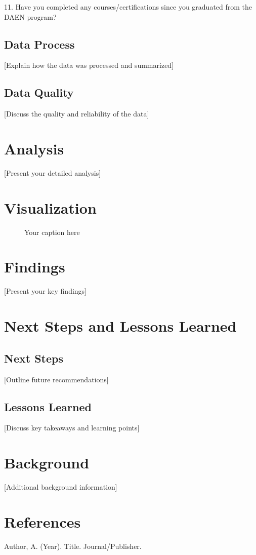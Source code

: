 \documentclass[12pt,a4paper]{article}
\begin{document}
11. Have you completed any courses/certifications since you graduated from the DAEN program? 

\subsection{Data Process}
[Explain how the data was processed and summarized]

\subsection{Data Quality}
[Discuss the quality and reliability of the data]

\section{Analysis}
[Present your detailed analysis]

\section{Visualization}
\begin{figure}[H]
    \centering
    \caption{Your caption here}
    \label{fig:your-label}
\end{figure}

\section{Findings}
[Present your key findings]

\section{Next Steps and Lessons Learned}
\subsection{Next Steps}
[Outline future recommendations]

\subsection{Lessons Learned}
[Discuss key takeaways and learning points]

\begin{appendices}
\section{Background}
[Additional background information]

\section{References}
\begin{thebibliography}{9}
     Author, A. (Year). Title. Journal/Publisher.
\end{thebibliography}
\end{appendices}
\end{document}
